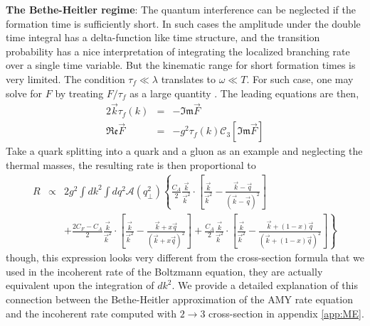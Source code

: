 {\bf The Bethe-Heitler regime}: The quantum interference can be neglected if the formation time is sufficiently short.
In such cases the amplitude under the double time integral has a delta-function like time structure, and the transition probability has a nice interpretation of integrating the localized branching rate over a single time variable.
But the kinematic range for short formation times is very limited. 
The condition $\tau_f \ll \lambda$ translates to $\omega \ll T$.
For such case, one may solve for $F$ by treating $F/\tau_f$ as a large quantity \cite{Ghiglieri:2015ala}.
The leading equations are then,
\begin{eqnarray}
2\vec{k}\tau_f(k) &=& - \mathfrak{Im} \vec{F} \\
\mathfrak{Re} \vec{F} &=& -g^2 \tau_f(k)\mathcal{C}_3[\mathfrak{Im} \vec{F}] 
\end{eqnarray}
Take a quark splitting into a quark and a gluon as an example and neglecting the thermal masses, the resulting rate is then proportional to 
\begin{eqnarray}
R &\propto& 2g^2 \int d k^2 \int d q^2 \mathcal{A}(q_\perp^2) \left\{
\frac{C_A}{2} \frac{\vec{k}}{\vec{k}^2}\cdot\left[\frac{\vec{k}}{\vec{k}^2}-\frac{\vec{k}-\vec{q}}{(\vec{k}-\vec{q})^2}\right] \right.\\\nonumber
&&+\left. \frac{2C_F-C_A}{2} \frac{\vec{k}}{\vec{k}^2}\cdot\left[\frac{\vec{k}}{\vec{k}^2}-\frac{\vec{k}+x\vec{q}}{(\vec{k}+x\vec{q})^2}\right]
+\frac{C_A}{2} \frac{\vec{k}}{\vec{k}^2}\cdot\left[\frac{\vec{k}}{\vec{k}^2}-\frac{\vec{k}+(1-x)\vec{q}}{(\vec{k}+(1-x)\vec{q})^2}\right]
\right\}
\end{eqnarray}
though, this expression looks very different from the cross-section formula that we used in the incoherent rate of the Boltzmann equation, they are actually equivalent upon the integration of $dk^2$. 
We provide a detailed explanation of this connection between the Bethe-Heitler approximation of the AMY rate equation and the incoherent rate computed with $2\rightarrow 3$ cross-section in appendix \ref{app:ME}.

